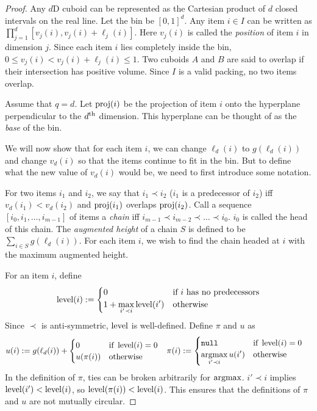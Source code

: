 \begin{proof}
Any $d$D cuboid can be represented as the Cartesian product of
$d$ closed intervals on the real line. Let the bin be $[0, 1]^d$.
Any item $i \in I$ can be written as $\prod_{j=1}^d [v_j(i), v_j(i) + \ell_j(i)]$.
Here $v_j(i)$ is called the \emph{position} of item $i$ in dimension $j$.
Since each item $i$ lies completely inside the bin, $0 \le v_j(i) < v_j(i) + \ell_j(i) \le 1$.
Two cuboids $A$ and $B$ are said to overlap if their intersection has positive volume.
Since $I$ is a valid packing, no two items overlap.

Assume \wLoG{} that $q = d$.
Let $\operatorname{proj}(i)$ be the projection of item $i$ onto the hyperplane
perpendicular to the $d^{\textrm{th}}$ dimension.
This hyperplane can be thought of as the \emph{base} of the bin.

We will now show that for each item $i$, we can change $\ell_d(i)$ to $g(\ell_d(i))$
and change $v_d(i)$ so that the items continue to fit in the bin.
But to define what the new value of $v_d(i)$ would be,
we need to first introduce some notation.

For two items $i_1$ and $i_2$, we say that $i_1 \prec i_2$
($i_1$ is a predecessor of $i_2$)
iff $v_d(i_1) < v_d(i_2)$ and $\operatorname{proj}(i_1)$ overlaps $\operatorname{proj}(i_2)$.
Call a sequence $[i_0, i_1, \ldots, i_{m-1}]$ of items a \emph{chain}
iff $i_{m-1} \prec i_{m-2} \prec \ldots \prec i_0$. $i_0$ is called the head of this chain.
The \emph{augmented height} of a chain $S$ is defined to be
$\sum_{i \in S} g(\ell_d(i))$.
For each item $i$, we wish to find the chain headed at $i$
with the maximum augmented height.

For an item $i$, define
\[ \operatorname{level}(i) := \begin{cases} 0 & \textrm{if } i \textrm{ has no predecessors}
\\ {\displaystyle 1 + \max_{i' \prec i} \operatorname{level}(i')} & \textrm{otherwise} \end{cases} \]
Since $\prec$ is anti-symmetric, $\operatorname{level}$ is well-defined.
Define $\pi$ and $u$ as
\begin{align*}
u(i) &:= g(\ell_d(i)) + \begin{cases} 0 & \textrm{if } \operatorname{level}(i) = 0
    \\ u(\pi(i)) & \textrm{otherwise}\end{cases}
& \pi(i) &:= \begin{cases} \texttt{null} & \textrm{if } \operatorname{level}(i) = 0
\\ {\displaystyle \operatorname*{argmax}_{i' \prec i} u(i')} & \textrm{otherwise} \end{cases}
\end{align*}
In the definition of $\pi$, ties can be broken arbitrarily for $\operatorname*{argmax}$.
$i' \prec i$ implies $\operatorname{level}(i') < \operatorname{level}(i)$, so $\operatorname{level}(\pi(i)) < \operatorname{level}(i)$.
This ensures that the definitions of $\pi$ and $u$ are not mutually circular.


\end{proof}
